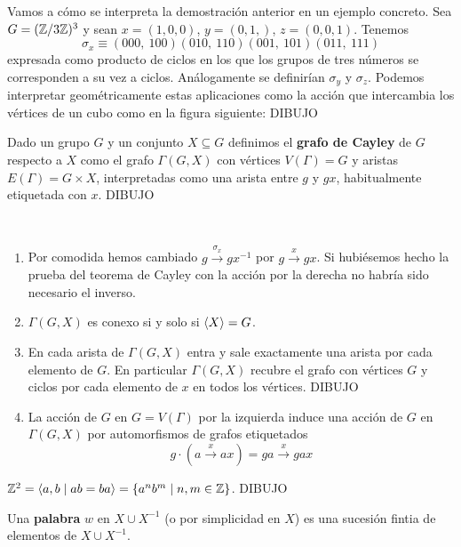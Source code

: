 \documentclass[twoside, 11pt]{article}
\begin{document}
\begin{ej}
Vamos a cómo se interpreta la demostración anterior en un ejemplo concreto. Sea $G=(\mathbb{Z}/3\mathbb{Z})^3$ y sean $x=(1,0,0)$, $y=(0,1,)$, $z=(0,0,1)$. Tenemos 
\[
\sigma_x\equiv (000,\ 100)(010,\ 110)(001,\ 101)(011,\ 111)
\]
expresada como producto de ciclos en los que los grupos de tres números se corresponden a su vez a ciclos. Análogamente se definirían $\sigma_y$ y $\sigma_z$. Podemos interpretar geométricamente estas aplicaciones como la acción que intercambia los vértices de un cubo como en la figura siguiente:
DIBUJO
\end{ej}

\begin{defi}
Dado un grupo $G$ y un conjunto $X\subseteq G$ definimos el \textbf{grafo de Cayley} de $G$ respecto a $X$ como el grafo $\Gamma(G,X)$ con vértices $V(\Gamma)=G$ y aristas $E(\Gamma)=G\times X$, interpretadas como una arista entre $g$ y $gx$, habitualmente etiquetada con $x$. DIBUJO
\end{defi}

\begin{observaciones}\
\begin{enumerate}
\item Por comodida hemos cambiado $g\xrightarrow{\sigma_x}gx^{-1}$ por $g\xrightarrow{x}gx$. Si hubiésemos hecho la prueba del teorema de Cayley con la acción por la derecha no habría sido necesario el inverso.
\item $\Gamma(G,X)$ es conexo si y solo si $\langle{X}\rangle=G$.
\item En cada arista de $\Gamma(G,X)$ entra y sale exactamente una arista por cada elemento de $G$. En particular $\Gamma(G,X)$ recubre el grafo con vértices $G$ y ciclos por cada elemento de $x$ en todos los vértices. DIBUJO
\item La acción de $G$ en $G=V(\Gamma)$ por la izquierda induce una acción de $G$ en $\Gamma(G,X)$ por automorfismos de grafos etiquetados
\[
g\cdot (a\xrightarrow{x}ax)=ga\xrightarrow{x}gax
\]
\end{enumerate}
\end{observaciones}

\begin{ej}
$\mathbb{Z}^2=\langle{a,b\mid ab=ba}\rangle=\{a^nb^m\mid n,m\in\mathbb{Z}\}$. DIBUJO
\end{ej}

\begin{defi}
Una \textbf{palabra} $w$ en $X\cup X^{-1}$ (o por simplicidad en $X$) es una sucesión fintia de elementos de $X\cup X^{-1}$.
\end{defi}
\end{document}
